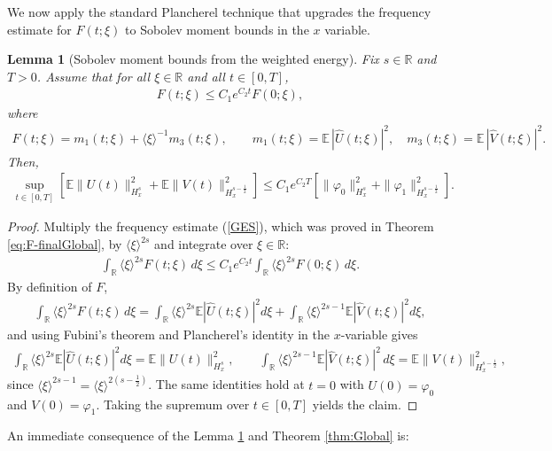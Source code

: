 \documentclass{article}
\newcommand{\ang}[1]{\langle #1\rangle}
\def\R{\mathbb{R}}
\def\E{\mathbb{E}}
\newtheorem{lemma}[theorem]{Lemma}
\begin{document}
We now apply the standard Plancherel technique that upgrades the frequency estimate for $F(t;\xi)$
to Sobolev moment bounds in the $x$ variable.

\begin{lemma}[Sobolev moment bounds from the weighted energy]\label{lem:sobolevMoment2}
Fix $s\in\R$ and $T>0$. Assume that for all $\xi\in\R$ and all $t\in[0,T]$,
\begin{align}\label{GES}
F(t;\xi)\le C_1 e^{C_2 t}F(0;\xi),
\end{align}
where
\begin{align*}
F(t;\xi)=m_1(t;\xi)+\ang{\xi}^{-1}m_3(t;\xi),\qquad
m_1(t;\xi)=\E\,|\widehat U(t;\xi)|^2,\quad
m_3(t;\xi)=\E\,|\widehat V(t;\xi)|^2.
\end{align*}
Then,
\begin{align*}
\sup_{t\in[0,T]}
\left[\E\|U(t)\|_{H_x^s}^2+\E\|V(t)\|_{H_x^{s-\frac12}}^2\right]
\le C_1 e^{C_2 T}\left[
\|\varphi_0\|_{H_x^s}^2+\|\varphi_1\|_{H_x^{s-\frac12}}^2
\right].
\end{align*}
\end{lemma}

\begin{proof}
Multiply the frequency estimate (\ref{GES}), which was proved in
Theorem \ref{eq:F-finalGlobal}, by $\ang{\xi}^{2s}$ and integrate over $\xi\in\R$:
\begin{align*}
\int_{\R}\ang{\xi}^{2s}F(t;\xi)\,d\xi
\le
C_1 e^{C_2 t}\int_{\R}\ang{\xi}^{2s}F(0;\xi)\,d\xi.
\end{align*}
By definition of $F$,
\begin{align*}
\int_{\R}\ang{\xi}^{2s}F(t;\xi)\,d\xi
=
\int_{\R}\ang{\xi}^{2s}\E|\widehat U(t;\xi)|^2d\xi
+
\int_{\R}\ang{\xi}^{2s-1}\E|\widehat V(t;\xi)|^2d\xi,
\end{align*}
and using Fubini's theorem and Plancherel's identity in the $x$-variable gives
\begin{align*}
\int_{\R}\ang{\xi}^{2s}\E|\widehat U(t;\xi)|^2d\xi
=\E\|U(t)\|_{H_x^s}^2,
\qquad
\int_{\R}\ang{\xi}^{2s-1}\E|\widehat V(t;\xi)|^2\,d\xi
=\E\|V(t)\|_{H_x^{s-\frac12}}^2,
\end{align*}
since $\ang{\xi}^{2s-1}=\ang{\xi}^{2(s-\frac12)}$. The same identities hold at $t=0$ with
$U(0)=\varphi_0$ and $V(0)=\varphi_1$. Taking the supremum over $t\in[0,T]$ yields the claim.
\end{proof}

An immediate consequence of the  Lemma \ref{lem:sobolevMoment2} and Theorem \ref{thm:Global} is:
\end{document}
